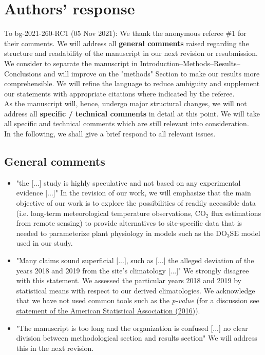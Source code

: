 \documentclass{scrartcl}
\begin{document}
\section*{Authors' response}
To bg-2021-260-RC1 (05 Nov 2021):
We thank the anonymous referee \#1 for their comments.
We will address all \textbf{general comments} raised regarding the structure and readability of the manuscript in our next revision or resubmission. We consider to separate the manuscript in Introduction--Methods--Results--Conclusions and will improve on the "methods" Section to make our results more comprehensible. We will refine the language to reduce ambiguity and supplement our statements with appropriate citations where indicated by the referee.\\
As the manuscript will, hence, undergo major structural changes, we will not address all \textbf{specific / technical comments} in detail at this point. We will take all specific and technical comments which are still relevant into consideration.\\
In the following, we shall give a brief respond to all relevant issues.

\subsection*{General comments} 
\begin{itemize}
    
    \item {\color{blue} "the [...] study is highly speculative and not based on any experimental evidence [...]"} In the revision of our work, we will emphasize that the main objective of our work is to explore the possibilities of readily accessible data (i.e. long-term meteorological temperature observations, $\mathrm{CO_2}$ flux estimations from remote sensing) to provide alternatives to site-specific data that is needed to parameterize plant physiology in models such as the $\mathrm{DO_3SE}$ model used in our study.
    \item {\color{blue} "Many claims sound superficial [...], such as [...] the alleged deviation of the years 2018 and 2019 from the site's climatology [...]"} We strongly disagree with this statement. We assessed the particular years 2018 and 2019 by statistical means with respect to our derived climatologies. We acknowledge that we have not used common tools such as the \emph{p-value} (for a discussion see \href{https://doi.org/10.1080/00031305.2016.1154108}{statement of the American Statistical Association (2016)}).
    \item {\color{blue} "The manuscript is too long and the organization is confused [...] no clear division between methodological section and results section"} We will address this in the next revision.

\end{itemize}
\end{document}
